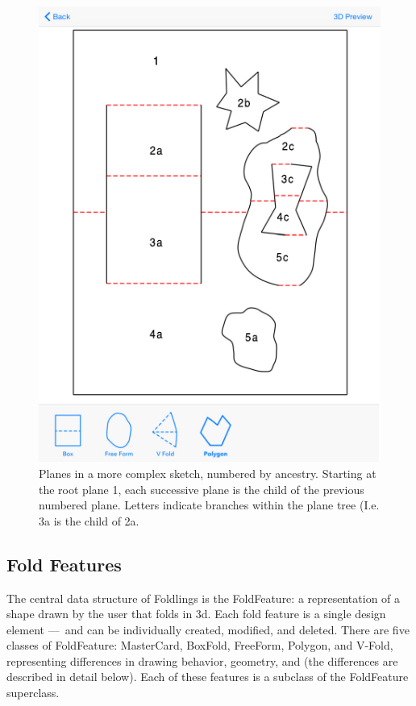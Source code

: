 \begin{figure}[htbp]
\centering
\includegraphics{figures/33_UI_Interface_Data_Structures/complex_sketch.pdf}
\caption{Planes in a more complex sketch, numbered by ancestry. Starting
at the root plane 1, each successive plane is the child of the previous
numbered plane. Letters indicate branches within the plane tree (I.e. 3a
is the child of 2a.}
\end{figure}

\subsection{Fold Features}\label{fold-features}

The central data structure of Foldlings is the FoldFeature: a
representation of a shape drawn by the user that folds in 3d. Each fold
feature is a single design element ---~and can be individually created,
modified, and deleted. There are five classes of FoldFeature:
MasterCard, BoxFold, FreeForm, Polygon, and V-Fold, representing
differences in drawing behavior, geometry, and (the differences are
described in detail below). Each of these features is a subclass of the
FoldFeature superclass.

